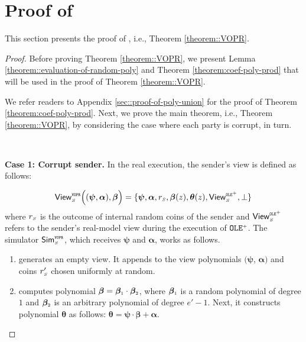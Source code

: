 


\section{Proof of \vopr}\label{sec::proof-of-vopr}

This section presents the proof of \vopr, i.e., Theorem \ref{theorem::VOPR}. 
\begin{proof}

Before proving Theorem \ref{theorem::VOPR}, we present Lemma \ref{theorem::evaluation-of-random-poly} and Theorem \ref{theorem:coef-poly-prod} that will be used in the proof of Theorem \ref{theorem::VOPR}. 






We refer readers to Appendix \ref{sec::proof-of-poly-union} for the proof of Theorem \ref{theorem:coef-poly-prod}. Next, we  prove the main theorem, i.e., Theorem \ref{theorem::VOPR}, by considering the case where each party is corrupt, in turn. 



\

\noindent\textbf{Case 1: Corrupt sender.} In the real execution, the sender's view is defined as follows: 


$$ \mathsf{View}_{\scriptscriptstyle S}^{\scriptscriptstyle \mathtt{VOPR}} \Big((\bm\psi, \bm{\alpha}), \bm\beta\Big)=\{\bm\psi, \bm{\alpha}, r_{\scriptscriptstyle S},  \bm\beta(z), \bm\theta(z), \mathsf{View}^{\scriptscriptstyle \mathtt{OLE}^{\scriptscriptstyle +}}_{\scriptscriptstyle S}, \bot \}$$
%
where $r_{\scriptscriptstyle S}$ is the outcome of internal random coins of the sender and $\mathsf{View}^{\scriptscriptstyle \mathtt{OLE}^{\scriptscriptstyle +}}_{\scriptscriptstyle S}$ refers to the sender's real-model view during the execution of  $\mathtt{OLE}^{\scriptscriptstyle +}$. The simulator $\mathsf{Sim}^{\scriptscriptstyle \mathtt{VOPR}}_{\scriptscriptstyle S}$, which receives $\bm\psi$ and $\bm \alpha$, works as follows. 
%
\begin{enumerate}
\item generates an empty view. It appends to the view polynomials $(\bm\psi$, $\bm{\alpha})$ and coins $r'_{\scriptscriptstyle S}$ chosen uniformly at random. 
%
\item computes polynomial $\bm\beta=\bm\beta_{\scriptscriptstyle 1} \cdot \bm\beta_{\scriptscriptstyle 2}$, where $\bm\beta_{\scriptscriptstyle 1}$ is a random polynomial of degree $1$ and $\bm\beta_{\scriptscriptstyle 2}$ is an arbitrary polynomial of degree $e'-1$. Next,  it constructs polynomial $\bm\theta$ as follows: $\bm\theta=\bm\psi\cdot \bm\beta+\bm \alpha$.


\end{enumerate}
\end{proof}
